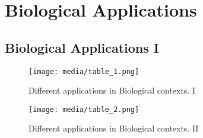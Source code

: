 \section{Biological Applications}
\label{sec:biological-applications}
\subsection{Biological Applications I}
\label{subsec:biological-applications-1}
\begin{frame}{\insertsubsection}
    \begin{figure}
        \centering
        \texttt{[image: media/table\_1.png]}
        \caption{Different applications in Biological contexts. I~\cite{Greener2021}}
    \end{figure}
\end{frame}
%
%
\begin{frame}{\insertsubsection}
    \begin{figure}
        \centering
        \texttt{[image: media/table\_2.png]}
        \caption{Different applications in Biological contexts. II~\cite{Greener2021}}
    \end{figure}
\end{frame}